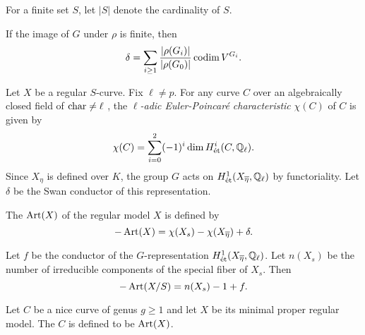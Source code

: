 For a finite set $S$, let $|S|$ denote the cardinality of $S$. 
\begin{rmk}\cite[Section~19.3]{serrelinrep}
 If the image of $G$ under $\rho$ is finite, then
 \[ \delta = \sum_{i \geq 1} \frac{|\rho(G_i)|}{|\rho(G_0)|} \operatorname{codim} V^{G_i} .\]
\end{rmk}

Let $X$ be a regular $S$-curve. Fix $\ell \neq p$. For any curve $C$ over an algebraically closed field of $\operatorname{char} \neq \ell$ , the {\textit{$\ell$-adic Euler-Poincar\'{e} characteristic}} $\chi(C)$ of $C$ is given by
\[ \chi(C) = \sum_{i=0}^2 (-1)^i \dim H^i_{\textup{\'{e}t}}(C,\mathbb Q_\ell) .\]
Since $X_\eta$ is defined over $K$, the group $G$ acts on $H^1_{{\textup{\'{e}t}}}(X_{\overline{\eta}},\mathbb Q_{\ell})$ by functoriality. Let $\delta$ be the Swan conductor of this representation. 

\begin{defin}
The {} $\operatorname{Art}(X)$ of the regular model $X$ is defined by
\[ -\operatorname{Art}(X) = \chi(X_s) - \chi(X_{\overline{\eta}}) + \delta .\] 
\end{defin}

\begin{lemma}\cite[Proposition 1]{liup}\label{artcondfor}
Let $f$ be the conductor of the $G$-representation $H^1_{\textup{\'{e}t}}(X_{\overline{\eta}},\mathbb Q_{\ell})$. Let $n(X_s)$ be the number of irreducible components of the special fiber of $X_s$. Then 
\[-\operatorname{Art}(X/S) = n(X_s)-1+f .\]
\end{lemma}

\begin{defin}
Let $C$ be a nice curve of genus $g \geq 1$ and let $X$ be its minimal proper regular model. The { $C$} is defined to be $\operatorname{Art}(X)$.
\end{defin}

